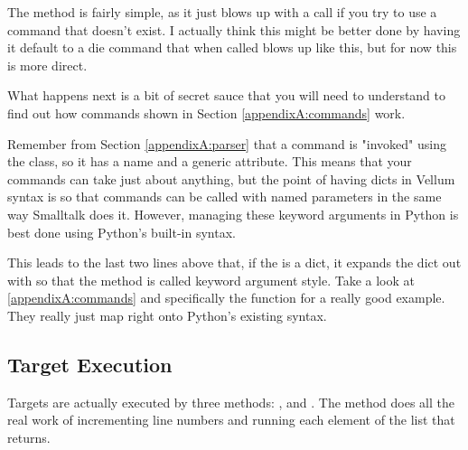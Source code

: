 The  method is fairly simple, as it just blows up with a
 call if you try to use a command that doesn't exist.  I actually
think this might be better done by having it default to a die command that when
called blows up like this, but for now this is more direct.

What happens next is a bit of secret sauce that you will need to understand to
find out how commands shown in Section \ref{appendixA:commands} work.  

Remember
from Section \ref{appendixA:parser} that a command is "invoked" using the
 class, so it has a name and a generic  attribute.
This means that your commands can take just about anything, but the point of
having dicts in Vellum syntax is so that commands can
be called with named parameters in the same way Smalltalk does it.  However,
managing these keyword arguments in Python is best done using Python's built-in
syntax.

This leads to the last two lines above that, if the  is a dict, it
expands the dict out with  so that the method is called keyword
argument style.  Take a look at \ref{appendixA:commands} and specifically the
 function for a really good example.  They really just map right
onto Python's existing syntax.

\subsection{Target Execution}

Targets are actually executed by three methods: ,
 and .  The  method does
all the real work of incrementing line numbers and running each element of the
list that  returns.

